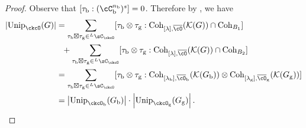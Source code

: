 \documentclass[12pt,a4paper]{amsart}
\def\abs#1{\left|{#1}\right|}
\newcommand{\CK}{{\mathcal {K}}}
\numberwithin{equation}{section}
\theoremstyle{remark}
\def\Unip{\mathrm{Unip}}
\def\LC{{}^{\scriptscriptstyle L}\sC}
\def\nbb{n_{\mathrm b}}
\def\Coh{\mathrm{Coh}}
\begin{document}
\begin{proof}
  Observe that $[\tau_{\mathrm b}:(\cC_{\mathrm b}^{\nbb})^{s}]=0$. Therefore by , we have
  \[
    \begin{split}
      \abs{\Unip_{\ckcO}(G)} & = \sum_{\tau_{\mathrm b}\boxtimes \tau_{\mathrm g}\in \LC_{\ckcO}} [\tau_{\mathrm b}\otimes \tau_{\mathrm g}:\Coh_{[\lambda],\bcO}(\CK(G))\cap \Coh_{B_1}]\\
    & \ \ + \sum_{\tau_{\mathrm b}\boxtimes \tau_{\mathrm g}\in \LC_{\ckcO}}[\tau_{\mathrm b}\otimes \tau_{\mathrm g}:\Coh_{[\lambda],\bcO}(\CK(G))\cap \Coh_{B_2}] \\
  &= \sum_{\tau_{\mathrm b}\boxtimes \tau_{\mathrm g}\in \LC_{\ckcO}} [\tau_{\mathrm b}\otimes \tau_{\mathrm g}:
  \Coh_{[\lambda_{\mathrm b}],\bcO_{\mathrm b}}(\CK(G_{\mathrm b}))\otimes \Coh_{[\lambda_{\mathrm g}],\bcO_{\mathrm g}}(\CK(G_{\mathrm g}))]\\
  &= \abs{\Unip_{\ckcO_{\mathrm b}}(G_{\mathrm b})}\cdot \abs{\Unip_{\ckcO_{\mathrm g}}(G_{\mathrm g})}.
\end{split}
\]
\end{proof}
\end{document}
